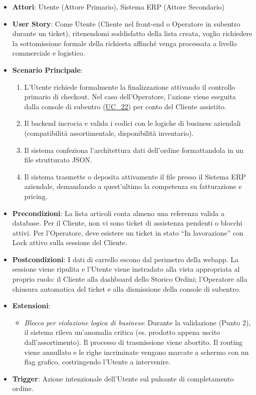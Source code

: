 \begin{itemize}
    \item \textbf{Attori}: Utente (Attore Primario), Sistema ERP (Attore Secondario)
    \item \textbf{User Story}: Come Utente (Cliente nel front-end o Operatore in subentro durante un ticket), ritenendomi soddisfatto della lista creata, voglio richiedere la sottomissione formale della richiesta affinché venga processata a livello commerciale e logistico.
    \item \textbf{Scenario Principale}: 
    \begin{enumerate}
        \item L'Utente richiede formalmente la finalizzazione attivando il controllo primario di checkout. Nel caso dell'Operatore, l'azione viene eseguita dalla console di subentro (\hyperref[uc_22]{UC\_22}) per conto del Cliente assistito.
        \item Il backend incrocia e valida i codici con le logiche di business aziendali (compatibilità assortimentale, disponibilità inventario).
        \item Il sistema confeziona l'architettura dati dell'ordine formattandola in un file strutturato JSON.
        \item Il sistema trasmette o deposita attivamente il file presso il Sistema ERP aziendale, demandando a quest'ultimo la competenza su fatturazione e pricing.
    \end{enumerate}
    \item \textbf{Precondizioni}: La lista articoli conta almeno una referenza valida a database. Per il Cliente, non vi sono ticket di assistenza pendenti o blocchi attivi. Per l'Operatore, deve esistere un ticket in stato ``In lavorazione'' con Lock attivo sulla sessione del Cliente.
    \item \textbf{Postcondizioni}: I dati di carrello escono dal perimetro della webapp. La sessione viene ripulita e l'Utente viene instradato alla vista appropriata al proprio ruolo: il Cliente alla dashboard dello Storico Ordini; l'Operatore alla chiusura automatica del ticket e alla dismissione della console di subentro.
    \item \textbf{Estensioni}:
    \begin{itemize}
        \item \textit{Blocco per violazione logica di business}: Durante la validazione (Punto 2), il sistema rileva un'anomalia critica (es. prodotto appena uscito dall'assortimento). Il processo di trasmissione viene abortito. Il routing viene annullato e le righe incriminate vengono marcate a schermo con un flag grafico, costringendo l'Utente a intervenire.
    \end{itemize}
    \item \textbf{Trigger}: Azione intenzionale dell'Utente sul pulsante di completamento ordine.
\end{itemize}

